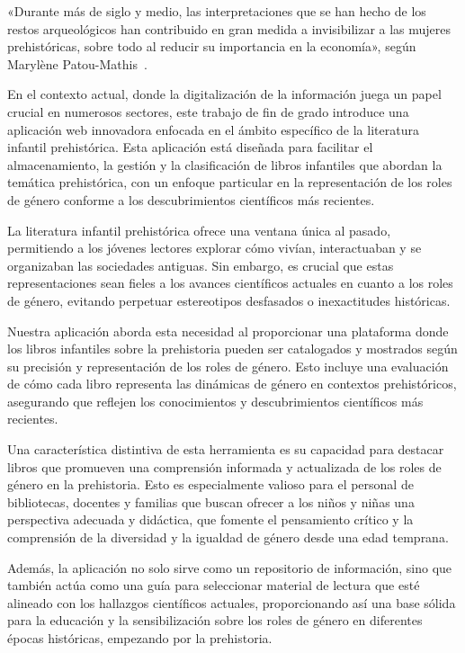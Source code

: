 «Durante más de siglo y medio, las interpretaciones que se han hecho de los restos arqueológicos han contribuido en gran medida a invisibilizar a las mujeres prehistóricas, sobre todo al reducir su importancia en la economía», según Marylène Patou-Mathis~\cite{CitaIntro}.

En el contexto actual, donde la digitalización de la información juega un papel crucial en numerosos sectores, este trabajo de fin de grado introduce una aplicación web innovadora enfocada en el ámbito específico de la literatura infantil prehistórica. Esta aplicación está diseñada para facilitar el almacenamiento, la gestión y la clasificación de libros infantiles que abordan la temática prehistórica, con un enfoque particular en la representación de los roles de género conforme a los descubrimientos científicos más recientes.

La literatura infantil prehistórica ofrece una ventana única al pasado, permitiendo a los jóvenes lectores explorar cómo vivían, interactuaban y se organizaban las sociedades antiguas. Sin embargo, es crucial que estas representaciones sean fieles a los avances científicos actuales en cuanto a los roles de género, evitando perpetuar estereotipos desfasados o inexactitudes históricas.

Nuestra aplicación aborda esta necesidad al proporcionar una plataforma donde los libros infantiles sobre la prehistoria pueden ser catalogados y mostrados según su precisión y representación de los roles de género. Esto incluye una evaluación de cómo cada libro representa las dinámicas de género en contextos prehistóricos, asegurando que reflejen los conocimientos y descubrimientos científicos más recientes.

Una característica distintiva de esta herramienta es su capacidad para destacar libros que promueven una comprensión informada y actualizada de los roles de género en la prehistoria. Esto es especialmente valioso para el personal de bibliotecas, docentes y familias que buscan ofrecer a los niños y niñas una perspectiva adecuada y didáctica, que fomente el pensamiento crítico y la comprensión de la diversidad y la igualdad de género desde una edad temprana.

Además, la aplicación no solo sirve como un repositorio de información, sino que también actúa como una guía para seleccionar material de lectura que esté alineado con los hallazgos científicos actuales, proporcionando así una base sólida para la educación y la sensibilización sobre los roles de género en diferentes épocas históricas, empezando por la prehistoria.

